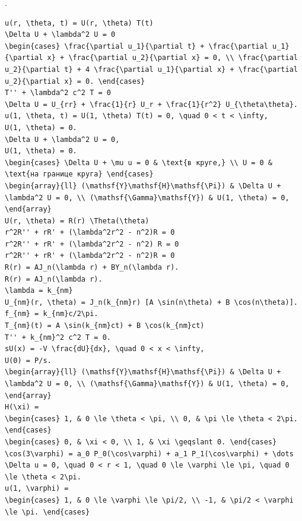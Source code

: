 \documentclass[
  ukrainian,
]{article}
\begin{document}
.

\begin{verbatim}
u(r, \theta, t) = U(r, \theta) T(t)
\Delta U + \lambda^2 U = 0
\begin{cases} \frac{\partial u_1}{\partial t} + \frac{\partial u_1}{\partial x} + \frac{\partial u_2}{\partial x} = 0, \\ \frac{\partial u_2}{\partial t} + 4 \frac{\partial u_1}{\partial x} + \frac{\partial u_2}{\partial x} = 0. \end{cases}
T'' + \lambda^2 c^2 T = 0
\Delta U = U_{rr} + \frac{1}{r} U_r + \frac{1}{r^2} U_{\theta\theta}.
u(1, \theta, t) = U(1, \theta) T(t) = 0, \quad 0 < t < \infty,
U(1, \theta) = 0.
\Delta U + \lambda^2 U = 0,
U(1, \theta) = 0.
\begin{cases} \Delta U + \mu u = 0 & \text{в круге,} \\ U = 0 & \text{на границе круга} \end{cases}
\begin{array}{ll} (\mathsf{Y}\mathsf{H}\mathsf{\Pi}) & \Delta U + \lambda^2 U = 0, \\ (\mathsf{\Gamma}\mathsf{Y}) & U(1, \theta) = 0, \end{array}
U(r, \theta) = R(r) \Theta(\theta)
r^2R'' + rR' + (\lambda^2r^2 - n^2)R = 0
r^2R'' + rR' + (\lambda^2r^2 - n^2) R = 0
r^2R'' + rR' + (\lambda^2r^2 - n^2)R = 0
R(r) = AJ_n(\lambda r) + BY_n(\lambda r).
R(r) = AJ_n(\lambda r).
\lambda = k_{nm}
U_{nm}(r, \theta) = J_n(k_{nm}r) [A \sin(n\theta) + B \cos(n\theta)].
f_{nm} = k_{nm}c/2\pi.
T_{nm}(t) = A \sin(k_{nm}ct) + B \cos(k_{nm}ct)
T'' + k_{nm}^2 c^2 T = 0.
sU(x) = -V \frac{dU}{dx}, \quad 0 < x < \infty,
U(0) = P/s.
\begin{array}{ll} (\mathsf{Y}\mathsf{H}\mathsf{\Pi}) & \Delta U + \lambda^2 U = 0, \\ (\mathsf{\Gamma}\mathsf{Y}) & U(1, \theta) = 0, \end{array}
H(\xi) =
\begin{cases} 1, & 0 \le \theta < \pi, \\ 0, & \pi \le \theta < 2\pi. \end{cases}
\begin{cases} 0, & \xi < 0, \\ 1, & \xi \geqslant 0. \end{cases}
\cos(3\varphi) = a_0 P_0(\cos\varphi) + a_1 P_1(\cos\varphi) + \dots
\Delta u = 0, \quad 0 < r < 1, \quad 0 \le \varphi \le \pi, \quad 0 \le \theta < 2\pi.
u(1, \varphi) =
\begin{cases} 1, & 0 \le \varphi \le \pi/2, \\ -1, & \pi/2 < \varphi \le \pi. \end{cases}

\end{verbatim}
\end{document}
